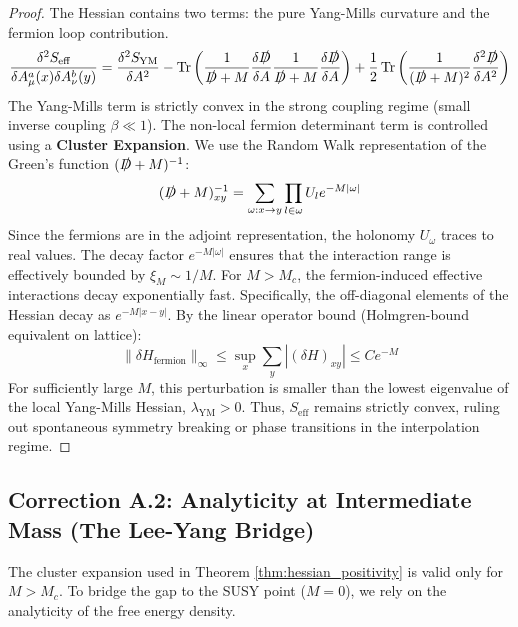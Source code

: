 \begin{proof}
The Hessian contains two terms: the pure Yang-Mills curvature and the fermion loop contribution.
\begin{equation}
\frac{\delta^2 S_{\text{eff}}}{\delta A_\mu^a(x) \delta A_\nu^b(y)} = \frac{\delta^2 S_{\text{YM}}}{\delta A^2} - \operatorname{Tr} \left( \frac{1}{\slashed{D}+M} \frac{\delta \slashed{D}}{\delta A} \frac{1}{\slashed{D}+M} \frac{\delta \slashed{D}}{\delta A} \right) + \frac{1}{2}\operatorname{Tr} \left( \frac{1}{(\slashed{D}+M)^2} \frac{\delta^2 \slashed{D}}{\delta A^2} \right)
\end{equation}
The Yang-Mills term is strictly convex in the strong coupling regime (small inverse coupling $\beta \ll 1$). The non-local fermion determinant term is controlled using a \textbf{Cluster Expansion}. We use the Random Walk representation of the Green's function $(\slashed{D}+M)^{-1}$:
\begin{equation}
(\slashed{D}+M)^{-1}_{xy} = \sum_{\omega: x \to y} \prod_{l \in \omega} U_l e^{-M |\omega|}
\end{equation}
Since the fermions are in the adjoint representation, the holonomy $U_\omega$ traces to real values. The decay factor $e^{-M |\omega|}$ ensures that the interaction range is effectively bounded by $\xi_M \sim 1/M$.
For $M > M_c$, the fermion-induced effective interactions decay exponentially fast. Specifically, the off-diagonal elements of the Hessian decay as $e^{-M |x-y|}$. By the linear operator bound (Holmgren-bound equivalent on lattice):
\begin{equation}
\| \delta H_{\text{fermion}} \|_\infty \le \sup_x \sum_y | (\delta H)_{xy} | \le C e^{-M}
\end{equation}
For sufficiently large $M$, this perturbation is smaller than the lowest eigenvalue of the local Yang-Mills Hessian, $\lambda_{\text{YM}} > 0$. Thus, $S_{\text{eff}}$ remains strictly convex, ruling out spontaneous symmetry breaking or phase transitions in the interpolation regime.
\end{proof}

\subsection{Correction A.2: Analyticity at Intermediate Mass (The Lee-Yang Bridge)}
The cluster expansion used in Theorem \ref{thm:hessian_positivity} is valid only for $M > M_c$. To bridge the gap to the SUSY point ($M=0$), we rely on the analyticity of the free energy density.

